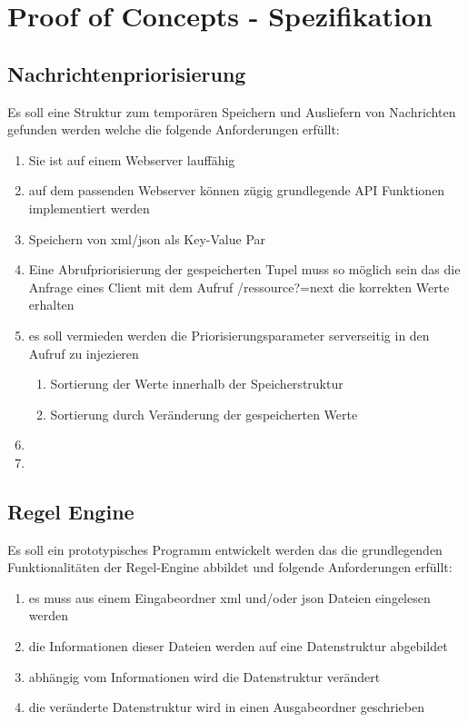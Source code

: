 \documentclass[11pt,oneside,a4paper,notitlepage]{article}
\begin{document}
%
\section{Proof of Concepts - Spezifikation}
%
\subsection{Nachrichtenpriorisierung}
Es soll eine Struktur zum temporären Speichern und Ausliefern von Nachrichten gefunden werden welche die folgende Anforderungen erfüllt:

\begin{enumerate}
\item Sie ist auf einem Webserver lauffähig
\item auf dem passenden Webserver können zügig grundlegende API Funktionen implementiert werden
\item Speichern von xml/json als Key-Value Par
\item Eine Abrufpriorisierung der gespeicherten Tupel muss so möglich sein das die Anfrage eines Client mit dem Aufruf /ressource?=next die korrekten Werte erhalten
\item es soll vermieden werden die Priorisierungsparameter serverseitig in den Aufruf zu injezieren
\begin{enumerate}
\item Sortierung der Werte innerhalb der Speicherstruktur
\item Sortierung durch Veränderung der gespeicherten Werte
\end{enumerate}
\item 
\item 
\end{enumerate}
\noindent
%

%
\subsection{Regel Engine}
Es soll ein prototypisches Programm entwickelt werden das die grundlegenden Funktionalitäten der Regel-Engine abbildet und folgende Anforderungen erfüllt:

\begin{enumerate}
\item es muss aus einem Eingabeordner xml und/oder json Dateien eingelesen werden
\item die Informationen dieser Dateien werden auf eine Datenstruktur abgebildet
\item abhängig vom Informationen wird die Datenstruktur verändert
\item die veränderte Datenstruktur wird in einen Ausgabeordner geschrieben
\end{enumerate}
\noindent
%
\end{document}
